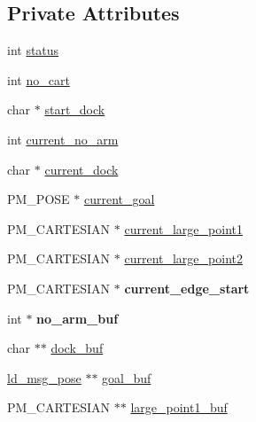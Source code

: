 \subsection*{Private Attributes}
\begin{DoxyCompactItemize}
\item 
int \mbox{\hyperlink{classcart__status_a641a53bcd134b03c70ddbad2309f3e1c}{status}}
\item 
int \mbox{\hyperlink{classcart__status_a7ddb73db75439f687289c32c3e10d625}{no\+\_\+cart}}
\item 
char $\ast$ \mbox{\hyperlink{classcart__status_a6581ba4998e76807e8837f317ff5630f}{start\+\_\+dock}}
\item 
int \mbox{\hyperlink{classcart__status_ad458c08316b2199cbfbe0e1186585432}{current\+\_\+no\+\_\+arm}}
\item 
char $\ast$ \mbox{\hyperlink{classcart__status_abee50a181916299e573abd0507fcba47}{current\+\_\+dock}}
\item 
P\+M\+\_\+\+P\+O\+SE $\ast$ \mbox{\hyperlink{classcart__status_aa6c952cba3af2fd3ad9c67567ecf419d}{current\+\_\+goal}}
\item 
P\+M\+\_\+\+C\+A\+R\+T\+E\+S\+I\+AN $\ast$ \mbox{\hyperlink{classcart__status_ab8c619198ba84c252a3740d2271f530e}{current\+\_\+large\+\_\+point1}}
\item 
P\+M\+\_\+\+C\+A\+R\+T\+E\+S\+I\+AN $\ast$ \mbox{\hyperlink{classcart__status_ab17505f9587a0b7c6d3111a8a1d38080}{current\+\_\+large\+\_\+point2}}
\item 
\mbox{\label{classcart__status_aad004440fb11b544f0bd692ec6d2230a}} 
P\+M\+\_\+\+C\+A\+R\+T\+E\+S\+I\+AN $\ast$ {\bfseries current\+\_\+edge\+\_\+start}
\item 
\mbox{\label{classcart__status_aa7dcfbd13720f8fb6b475174ab72ea3a}} 
int $\ast$ {\bfseries no\+\_\+arm\+\_\+buf}
\item 
char $\ast$$\ast$ \mbox{\hyperlink{classcart__status_a8f3151213022c1aab59d0c0dae5e4b4c}{dock\+\_\+buf}}
\item 
\mbox{\hyperlink{structld__msg__pose}{ld\+\_\+msg\+\_\+pose}} $\ast$$\ast$ \mbox{\hyperlink{classcart__status_a4912ff0b77258f77f4f7c118ad8345c7}{goal\+\_\+buf}}
\item 
P\+M\+\_\+\+C\+A\+R\+T\+E\+S\+I\+AN $\ast$$\ast$ \mbox{\hyperlink{classcart__status_ab22c188f57ded9039c5bf65b56d14967}{large\+\_\+point1\+\_\+buf}}
\item 
$$
\end{DoxyCompactItemize}
